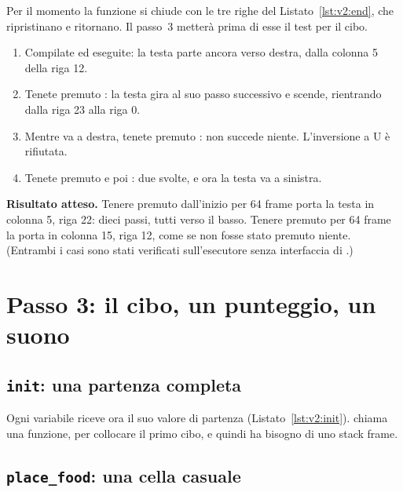 Per il momento la funzione si chiude con le tre righe del
Listato~\ref{lst:v2:end}, che ripristinano  e ritornano. Il passo~3
metterà prima di esse il test per il cibo.


\begin{prgcheck}
\begin{enumerate}[nosep]
\item Compilate ed eseguite: la testa parte ancora verso destra, dalla colonna
  5 della riga 12.
\item Tenete premuto : la testa gira al suo passo successivo e
  scende, rientrando dalla riga 23 alla riga 0.
\item Mentre va a destra, tenete premuto : non succede niente.
  L'inversione a U è rifiutata.
\item Tenete premuto  e poi : due svolte, e ora la testa va
  a sinistra.
\end{enumerate}
\textbf{Risultato atteso.} Tenere premuto  dall'inizio per 64 frame
porta la testa in colonna 5, riga 22: dieci passi, tutti verso il basso. Tenere
premuto  per 64 frame la porta in colonna 15, riga 12, come se non
fosse stato premuto niente. (Entrambi i casi sono stati verificati
sull'esecutore senza interfaccia di \prgqt.)
\end{prgcheck}

\section{Passo 3: il cibo, un punteggio, un suono}

\subsection{\texttt{init}: una partenza completa}


Ogni variabile riceve ora il suo valore di partenza
(Listato~\ref{lst:v2:init}).  chiama una funzione, per collocare il
primo cibo, e quindi ha bisogno di uno stack frame.

\subsection{\texttt{place\_food}: una cella casuale}

